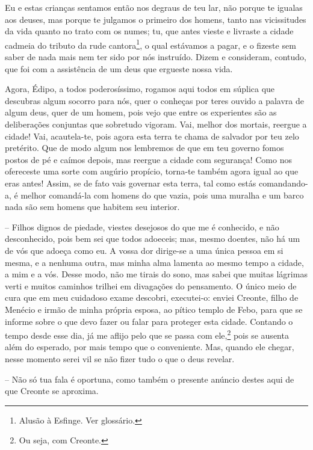  Eu e estas crianças sentamos então nos degraus de teu lar, não
porque te igualas aos deuses, mas porque te julgamos o primeiro dos
homens, tanto nas vicissitudes da vida quanto no trato com os numes; tu,
que antes vieste e livraste a cidade cadmeia do tributo da rude
cantora\footnote{Alusão à Esfinge. Ver glossário.}, o qual estávamos a
pagar, e o fizeste sem saber de nada mais nem ter sido por nós
instruído. Dizem e consideram, contudo, que foi com a assistência de um
deus que ergueste nossa vida.

 Agora, Édipo, a todos poderosíssimo, rogamos aqui todos em súplica
que descubras algum socorro para nós, quer o conheças por teres ouvido a
palavra de algum deus, quer de um homem, pois vejo que entre os
experientes são as deliberações conjuntas que sobretudo vigoram. Vai,
melhor dos mortais, reergue a cidade! Vai, acautela-te, pois agora esta
terra te chama de salvador por teu zelo pretérito. Que de  modo
algum nos lembremos de que em teu governo fomos postos de pé e caímos
depois, mas reergue a cidade com segurança! Como nos ofereceste uma
sorte com augúrio propício, torna-te também agora igual ao que eras
antes! Assim, se de fato vais governar esta terra, tal como estás
comandando-a, é melhor comandá-la com homens do que vazia, pois uma
muralha e um barco nada são sem homens que habitem seu interior.

 --   Filhos dignos de piedade, viestes desejosos do que me é conhecido, e não
 desconhecido, pois bem sei que todos adoeceis; mas, mesmo doentes,
não há um de vós que adoeça como eu. A vossa dor dirige-se a uma única
pessoa em si mesma, e a nenhuma outra, mas minha alma lamenta ao mesmo
tempo a cidade, a mim e a vós. Desse modo, não me tirais do sono, mas
sabei que muitas lágrimas verti e muitos caminhos trilhei em divagações
do pensamento. O único meio de cura que em meu cuidadoso  exame
descobri, executei-o: enviei Creonte, filho de Menécio e irmão de minha
própria esposa, ao pítico templo de Febo, para que se informe sobre o
que devo fazer ou falar para proteger esta cidade. Contando o tempo
desde esse dia, já me aflijo pelo que se passa com ele,\footnote{Ou seja,
  com Creonte.} pois se ausenta além do esperado, por mais tempo que o
conveniente. Mas, quando ele chegar, nesse momento serei vil se não
fizer tudo o que o deus revelar.

 --   Não só tua fala é oportuna, como também o presente anúncio destes aqui
de que Creonte se aproxima.

